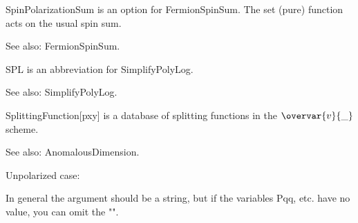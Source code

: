 


SpinPolarizationSum is an option for FermionSpinSum. The set (pure) function acts on the usual spin sum.

See also: { }FermionSpinSum.



SPL is an abbreviation for SimplifyPolyLog.

See also:  SimplifyPolyLog.



SplittingFunction[pxy] is a database of splitting functions in the \(\overvar{v}{\_}\) scheme.



See also:  AnomalousDimension.


Unpolarized case:


In general the argument should be a string, but if the variables Pqq, etc. have no value, you can omit the "".










